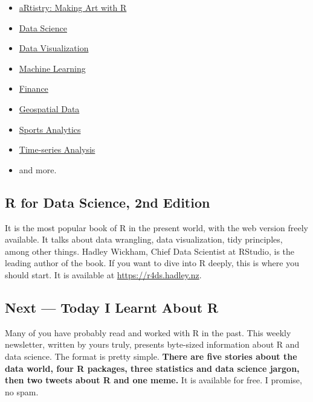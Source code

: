 \documentclass[
  letterpaper,
  DIV=11,
  numbers=noendperiod]{scrartcl}
\begin{document}
\begin{itemize}
\item
  \href{https://www.bigbookofr.com/art.html}{aRtistry: Making Art with
  R}
\item
  \href{https://www.bigbookofr.com/data-science.html}{Data Science}
\item
  \href{https://www.bigbookofr.com/data-visualization.html}{Data
  Visualization}
\item
  \href{https://www.bigbookofr.com/machine-learning.html}{Machine
  Learning}
\item
  \href{https://www.bigbookofr.com/finance.html}{Finance}
\item
  \href{https://www.bigbookofr.com/geospatial.html}{Geospatial Data}
\item
  \href{https://www.bigbookofr.com/sport-analytics.html}{Sports
  Analytics}
\item
  \href{https://www.bigbookofr.com/time-series-analysis-and-forecasting.html}{Time-series
  Analysis}
\item
  and more.
\end{itemize}

\hypertarget{r-for-data-science-2nd-edition}{%
\subsection{R for Data Science, 2nd
Edition}\label{r-for-data-science-2nd-edition}}

It is the most popular book of R in the present world, with the web
version freely available. It talks about data wrangling, data
visualization, tidy principles, among other things. Hadley Wickham,
Chief Data Scientist at RStudio, is the leading author of the book. If
you want to dive into R deeply, this is where you should start. It is
available at \url{https://r4ds.hadley.nz}.

\hypertarget{next-today-i-learnt-about-r}{%
\subsection{Next --- Today I Learnt About
R}\label{next-today-i-learnt-about-r}}

Many of you have probably read and worked with R in the past. This
weekly newsletter, written by yours truly, presents byte-sized
information about R and data science. The format is pretty simple.
\textbf{There are five stories about the data world, four R packages,
three statistics and data science jargon, then two tweets about R and
one meme.} It is available for free. I promise, no spam.
\end{document}
